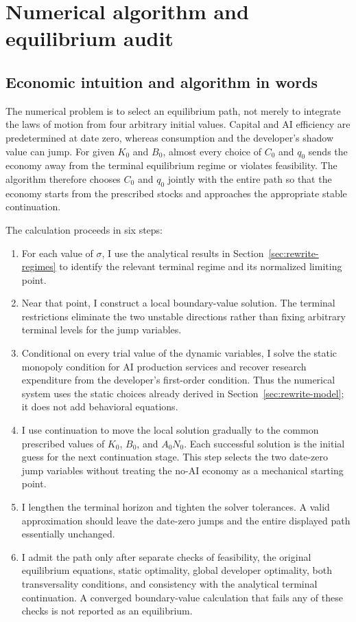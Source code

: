 \ifshowlegacysimulations
\section{Numerical algorithm and equilibrium audit}
\label{app:rewrite-algorithm}

\subsection{Economic intuition and algorithm in words}

The numerical problem is to select an equilibrium path, not merely to
integrate the laws of motion from four arbitrary initial values. Capital and
AI efficiency are predetermined at date zero, whereas consumption and the
developer's shadow value can jump. For given $K_0$ and $B_0$, almost every
choice of $C_0$ and $q_0$ sends the economy away from the terminal equilibrium
regime or violates feasibility. The algorithm therefore chooses $C_0$ and
$q_0$ jointly with the entire path so that the economy starts from the
prescribed stocks and approaches the appropriate stable continuation.

The calculation proceeds in six steps:
\begin{enumerate}[leftmargin=*,itemsep=0.25em]
 \item For each value of $\sigma$, I use the analytical results in
 Section~\ref{sec:rewrite-regimes} to identify the relevant terminal regime
 and its normalized limiting point.
 \item Near that point, I construct a local boundary-value solution. The
 terminal restrictions eliminate the two unstable directions rather than
 fixing arbitrary terminal levels for the jump variables.
 \item Conditional on every trial value of the dynamic variables, I solve the
 static monopoly condition for AI production services and recover research
 expenditure from the developer's first-order condition. Thus the numerical
 system uses the static choices already derived in Section~\ref{sec:rewrite-model};
 it does not add behavioral equations.
 \item I use continuation to move the local solution gradually to the common
 prescribed values of $K_0$, $B_0$, and $A_0N_0$. Each successful solution is
 the initial guess for the next continuation stage. This step selects the two
 date-zero jump variables without treating the no-AI economy as a mechanical
 starting point.
 \item I lengthen the terminal horizon and tighten the solver tolerances. A
 valid approximation should leave the date-zero jumps and the entire displayed
 path essentially unchanged.
 \item I admit the path only after separate checks of feasibility, the original
 equilibrium equations, static optimality, global developer optimality, both
 transversality conditions, and consistency with the analytical terminal
 continuation. A converged boundary-value calculation that fails any of these
 checks is not reported as an equilibrium.
\end{enumerate}


